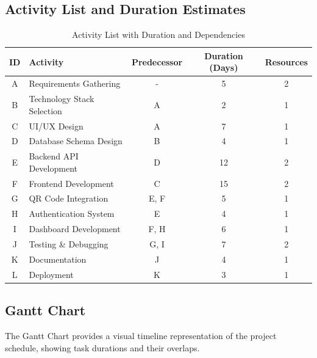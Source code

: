 \documentclass[12pt,a4paper]{article}
\begin{document}
\subsection{Activity List and Duration Estimates}

\begin{table}[H]
\centering
\small
\begin{tabular}{|c|p{5.5cm}|c|c|c|}
\hline
\textbf{ID} & \textbf{Activity} & \textbf{Predecessor} & \textbf{Duration (Days)} & \textbf{Resources} \\
\hline
A & Requirements Gathering & - & 5 & 2 \\
\hline
B & Technology Stack Selection & A & 2 & 1 \\
\hline
C & UI/UX Design & A & 7 & 1 \\
\hline
D & Database Schema Design & B & 4 & 1 \\
\hline
E & Backend API Development & D & 12 & 2 \\
\hline
F & Frontend Development & C & 15 & 2 \\
\hline
G & QR Code Integration & E, F & 5 & 1 \\
\hline
H & Authentication System & E & 4 & 1 \\
\hline
I & Dashboard Development & F, H & 6 & 1 \\
\hline
J & Testing \& Debugging & G, I & 7 & 2 \\
\hline
K & Documentation & J & 4 & 1 \\
\hline
L & Deployment & K & 3 & 1 \\
\hline
\end{tabular}
\caption{Activity List with Duration and Dependencies}
\end{table}

\subsection{Gantt Chart}

The Gantt Chart provides a visual timeline representation of the project schedule, showing task durations and their overlaps.
\end{document}
